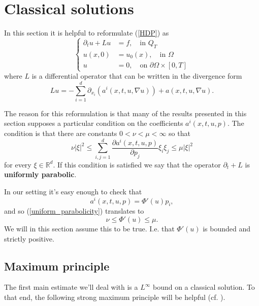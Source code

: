 \documentclass[11pt, a4paper]{article}
\begin{document}
\section{Classical solutions}
In this section it is helpful to reformulate (\ref{HDP}) as 
\begin{equation}
	\begin{cases}
		\partial_t u + Lu &= f, \quad \text{in } Q_T \\
		u(x,0) &= u_0(x), \quad \text{in } \Omega \\
		u &= 0, \quad \text{on } \partial \Omega \times [0,T]
	\end{cases}
\end{equation}
where $L$ is a differential operator that can be written in the divergence form
\begin{equation}
Lu = -\sum_{i=1}^d \partial_{x_i}(a^i(x,t,u,\nabla u)) + a(x,t,u,\nabla u).
\end{equation}

The reason for this reformulation is that many of the results presented in this section supposes a particular condition on the coefficients $a^i(x,t,u,p)$. The condition is that there are constants $0 < \nu < \mu < \infty $ so that
\begin{equation}
\label{uniform_parabolicity}
\nu |\xi|^2 \leq \sum_{i,j=1}^d \frac{\partial a^i(x,t,u,p)}{\partial p_j}\xi_i \xi_j \leq \mu |\xi|^2 
\end{equation}
for every $\xi \in \mathbb{R}^d$. If this condition is satisfied we say that the operator $\partial_t + L$ is \textbf{uniformly parabolic}.

In our setting it's easy enough to check that
\begin{equation*}
a^i(x,t,u,p) = \Phi'(u)p_i,
\end{equation*}
and so (\ref{uniform_parabolicity}) translates to
\begin{equation}
\label{uniform_parabGPME}
\nu \leq \Phi'(u) \leq \mu.
\end{equation}
We will in this section assume this to be true. I.e. that $\Phi'(u)$ is bounded and strictly positive.
\subsection{Maximum principle}
The first main estimate we'll deal with is a $L^\infty$ bound on a classical solution. To that end, the following strong maximum principle will be helpful (cf. \citep[p. 396]{evans}).
\end{document}

